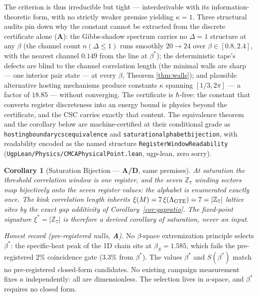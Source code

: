 \documentclass[11pt]{article}
\newtheorem{corollary}[theorem]{Corollary}
\theoremstyle{remark}
\newcommand{\lean}[1]{%
  \penalty-100
  \begingroup\def\_{\textunderscore\allowbreak}\texttt{#1}\endgroup}
\newcommand{\CatA}{\textbf{A}}
\newcommand{\CatAD}{\textbf{A/D}}
\begin{document}
The criterion is thus irreducible but tight --- interderivable with its
information-theoretic form, with no strictly weaker premise yielding
$\kappa = 1$. Three structural audits pin down why the constant cannot be
extracted from the discrete certificate alone (\CatA{}): the Gibbs-shadow
spectrum carries no $\Delta = 1$ structure at any $\beta$ (the channel count
$n(\Delta \le 1)$ runs smoothly $20 \to 24$ over $\beta \in [0.8, 2.4]$, with
the nearest channel $0.149$ from the line at $\beta^*$); the deterministic
tape's defects are blind to the channel correlation length (the minimal walls
are sharp --- one interior pair state --- at every $\beta$, Theorem
\ref{thm:walls}); and plausible alternative hosting mechanisms produce
constants $\kappa$ spanning $[1/3, 2\pi]$ --- a factor of $18.85$ --- without
converging. The certificate is $\hbar$-free: the constant that converts
register discreteness into an energy bound is physics beyond the certificate,
and the CSC carries exactly that content. The equivalence theorem and the
corollary below are machine-certified at their conditional grade as
\lean{hosting\_boundary\_csc\_equivalence} and
\lean{saturation\_alphabet\_bijection}, with readability encoded as the named
structure \lean{RegisterWindowReadability}
(\texttt{UgpLean/Physics/CMCAPhysicalPoint.lean}, ugp-lean, zero sorry).

\begin{corollary}[Saturation Bijection --- \CatAD{}, same premises]
\label{cor:bijection}
At saturation the threshold correlation window is one register, and the seven
$\mathbb{Z}_7$ winding sectors map bijectively onto the seven register values:
the alphabet is enumerated exactly once. The kink correlation length inherits
$\xi(M) = 7\,\xi(\Lambda_{\rm GTE}) = 7 = |\mathbb{Z}_7|$ lattice sites by the
exact gap additivity of Corollary~\ref{cor:gapratio}. The fixed-point
signature $\xi^* = |\mathbb{Z}_7|$ is therefore a derived corollary of
saturation, never an input.
\end{corollary}

\medskip
\noindent\emph{Honest record (pre-registered nulls, \CatA{}).} No $\beta$-space
extremization principle selects $\beta^*$: the specific-heat peak of the 1D
chain sits at $\beta_S = 1.585$, which fails the pre-registered 2\%
coincidence gate ($3.3\%$ from $\beta^*$). The values $\beta^*$ and
$S(\beta^*)$ match no pre-registered closed-form candidates. No existing
campaign measurement fixes $a$ independently: all are dimensionless. The
selection lives in $a$-space, and $\beta^*$ requires no closed form.
\end{document}
